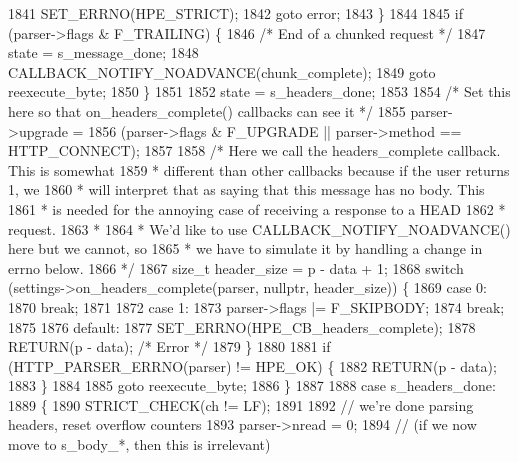 \begin{DoxyCode}
1841           SET_ERRNO(HPE_STRICT);
1842           \textcolor{keywordflow}{goto} error;
1843         \}
1844 
1845         \textcolor{keywordflow}{if} (parser->flags & F_TRAILING) \{
1846           \textcolor{comment}{/* End of a chunked request */}
1847           state = s_message_done;
1848           CALLBACK_NOTIFY_NOADVANCE(chunk\_complete);
1849           \textcolor{keywordflow}{goto} reexecute\_byte;
1850         \}
1851 
1852         state = s_headers_done;
1853 
1854         \textcolor{comment}{/* Set this here so that on\_headers\_complete() callbacks can see it */}
1855         parser->upgrade =
1856             (parser->flags & F_UPGRADE || parser->method == HTTP_CONNECT);
1857 
1858         \textcolor{comment}{/* Here we call the headers\_complete callback. This is somewhat}
1859 \textcolor{comment}{         * different than other callbacks because if the user returns 1, we}
1860 \textcolor{comment}{         * will interpret that as saying that this message has no body. This}
1861 \textcolor{comment}{         * is needed for the annoying case of receiving a response to a HEAD}
1862 \textcolor{comment}{         * request.}
1863 \textcolor{comment}{         *}
1864 \textcolor{comment}{         * We'd like to use CALLBACK\_NOTIFY\_NOADVANCE() here but we cannot, so}
1865 \textcolor{comment}{         * we have to simulate it by handling a change in errno below.}
1866 \textcolor{comment}{         */}
1867         \textcolor{keywordtype}{size\_t} header\_size = p - data + 1;
1868         \textcolor{keywordflow}{switch} (settings->on_headers_complete(parser, \textcolor{keyword}{nullptr}, header\_size)) \{
1869           \textcolor{keywordflow}{case} 0:
1870             \textcolor{keywordflow}{break};
1871 
1872           \textcolor{keywordflow}{case} 1:
1873             parser->flags |= F_SKIPBODY;
1874             \textcolor{keywordflow}{break};
1875 
1876           \textcolor{keywordflow}{default}:
1877             SET_ERRNO(HPE_CB_headers_complete);
1878             RETURN(p - data); \textcolor{comment}{/* Error */}
1879         \}
1880 
1881         \textcolor{keywordflow}{if} (HTTP_PARSER_ERRNO(parser) != HPE_OK) \{
1882           RETURN(p - data);
1883         \}
1884 
1885         \textcolor{keywordflow}{goto} reexecute\_byte;
1886       \}
1887 
1888       \textcolor{keywordflow}{case} s_headers_done:
1889       \{
1890         STRICT_CHECK(ch != LF);
1891 
1892         \textcolor{comment}{// we're done parsing headers, reset overflow counters}
1893         parser->nread = 0;
1894         \textcolor{comment}{// (if we now move to s\_body\_*, then this is irrelevant)}

\end{DoxyCode}
